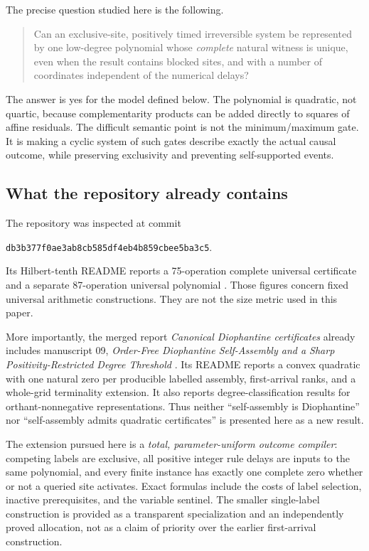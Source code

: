 \documentclass[11pt,letterpaper]{article}
\theoremstyle{definition}
\theoremstyle{remark}
\newcommand{\pin}{\texttt{db3b377f0ae3ab8cb585df4eb4b859cbee5ba3c5}}
\begin{document}
The precise question studied here is the following.
\begin{quote}
Can an exclusive-site, positively timed irreversible system be represented
by one low-degree polynomial whose \emph{complete} natural witness is
unique, even when the result contains blocked sites, and with a number of
coordinates independent of the numerical delays?
\end{quote}
The answer is yes for the model defined below. The polynomial is quadratic,
not quartic, because complementarity products can be added directly to
squares of affine residuals. The difficult semantic point is not the
minimum/maximum gate. It is making a cyclic system of such gates describe
exactly the actual causal outcome, while preserving exclusivity and
preventing self-supported events.

\subsection{What the repository already contains}
The repository was inspected at commit
\begin{center}\small\pin.\end{center}
Its Hilbert-tenth README reports a 75-operation complete universal
certificate and a separate 87-operation universal polynomial
\cite{ts:repo-h10,ts:repo-native}. Those figures concern fixed universal
arithmetic constructions. They are not the size metric used in this paper.

More importantly, the merged report \emph{Canonical Diophantine
certificates} already includes manuscript 09, \emph{Order-Free Diophantine
Self-Assembly and a Sharp Positivity-Restricted Degree Threshold}
\cite{ts:repo-canonical}. Its README reports a convex quadratic with one
natural zero per producible labelled assembly, first-arrival ranks, and a
whole-grid terminality extension. It also reports degree-classification
results for orthant-nonnegative representations. Thus neither
``self-assembly is Diophantine'' nor ``self-assembly admits quadratic
certificates'' is presented here as a new result.

The extension pursued here is a \emph{total, parameter-uniform outcome
compiler}: competing labels are exclusive, all positive integer rule delays
are inputs to the same polynomial, and every finite instance has exactly
one complete zero whether or not a queried site activates. Exact formulas
include the costs of label selection, inactive prerequisites, and the
variable sentinel. The smaller single-label construction is provided as a
transparent specialization and an independently proved allocation, not as
a claim of priority over the earlier first-arrival construction.
\end{document}
